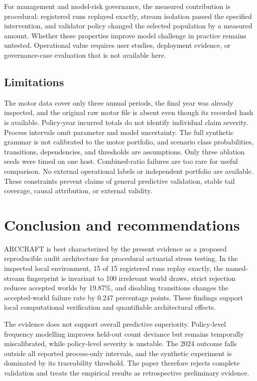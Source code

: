 For management and model-risk governance, the measured contribution is procedural: registered runs replayed exactly, stream isolation passed the specified intervention, and validator policy changed the selected population by a measured amount. Whether these properties improve model challenge in practice remains untested. Operational value requires user studies, deployment evidence, or governance-case evaluation that is not available here.

\subsection{Limitations}\label{sec:limitations}

The motor data cover only three annual periods, the final year was already inspected, and the original raw motor file is absent even though its recorded hash is available. Policy-year incurred totals do not identify individual claim severity. Process intervals omit parameter and model uncertainty. The full synthetic grammar is not calibrated to the motor portfolio, and scenario class probabilities, transitions, dependencies, and thresholds are assumptions. Only three ablation seeds were timed on one host. Combined-ratio failures are too rare for useful comparison. No external operational labels or independent portfolio are available. These constraints prevent claims of general predictive validation, stable tail coverage, causal attribution, or external validity.

\section{Conclusion and recommendations}\label{sec:conclusion-and-recommendations}

ARCCRAFT is best characterized by the present evidence as a proposed reproducible audit architecture for procedural actuarial stress testing. In the inspected local environment, 15 of 15 registered runs replay exactly, the named-stream fingerprint is invariant to 100 irrelevant world draws, strict rejection reduces accepted worlds by 19.87\%, and disabling transitions changes the accepted-world failure rate by 0.247 percentage points. These findings support local computational verification and quantifiable architectural effects.

The evidence does not support overall predictive superiority. Policy-level frequency modelling improves held-out count deviance but remains temporally miscalibrated, while policy-level severity is unstable. The 2024 outcome falls outside all reported process-only intervals, and the synthetic experiment is dominated by its traceability threshold. The paper therefore rejects complete validation and treats the empirical results as retrospective preliminary evidence.

